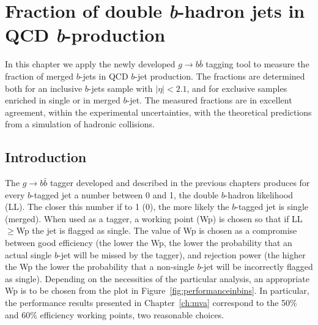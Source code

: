 %
\chapter{Fraction of double {\em b\hspace{.5mm}}-hadron jets in QCD {\em b\hspace{.5mm}}-production}\label{ch:gbbfraction}


In this chapter we apply the newly developed $g \rightarrow b\bar{b}$ tagging tool to measure the fraction of merged $b$-jets in QCD $b$-jet production. The fractions are determined both for an inclusive $b$-jets sample with $|\eta|<2.1$, and for exclusive samples enriched in single or in merged $b$-jet.
The measured fractions are in excellent agreement, within the experimental uncertainties, with the theoretical predictions from a simulation of hadronic collisions.


\section{Introduction}\label{sec:FitIntro}

The $g\rightarrow b\bar{b}$ tagger developed and described in the previous chapters produces for every $b$-tagged jet a number between 0 and 1, the double $b$-hadron likelihood (LL). The closer this number if to 1 (0), the more likely the $b$-tagged jet is single (merged). When used as a tagger, a working point (Wp) is chosen so that if LL$\geq$Wp the jet is flagged as single. The value of Wp is chosen as a compromise between good efficiency (the lower the Wp, the lower the probability that an actual single $b$-jet will be missed by the tagger), and rejection power (the higher the Wp the lower the probability that a non-single $b$-jet will be incorrectly flagged as single). Depending on the necessities of the particular analysis, an appropriate Wp is to be chosen from the plot in Figure~\ref{fig:performanceinbins}. In particular, the performance results presented in Chapter~\ref{ch:mva} correspond to the 50\% and 60\% efficiency working points, two reasonable choices.

